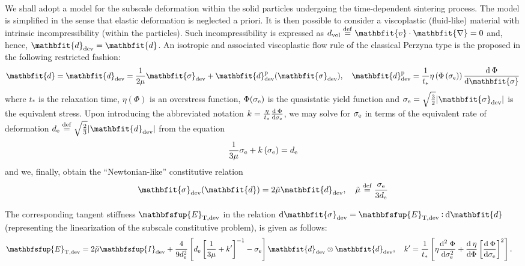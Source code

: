 \documentclass[10pt,a4paper]{article}
\renewcommand{\ta}[1]{\mathbfit{#1}}
\renewcommand{\ts}[1]{\mathbfit{#1}}
\renewcommand{\tf}[1]{\mathbfsfup{#1}}
\newcommand{\tang}{\mathrm{T}}
\begin{document}
We shall adopt a model for the subscale deformation within the solid particles undergoing the time-dependent sintering process. The model is simplified in the sense that elastic deformation is neglected a priori. It is then possible to consider a viscoplastic (fluid-like) material with intrinsic incompressibility (within the particles). Such incompressibility is expressed as $d_\vol\defeq\ta{v}\cdot\ts{\nabla}=0$ and, hence, $\ts{d}_\dev=\ts{d}$. An isotropic and associated viscoplastic flow rule of the classical Perzyna type is the proposed in the following restricted fashion:
\begin{equation}
    \ts{d}=\ts{d}_\dev = \frac{1}{2\mu}\ts{\sigma}_\dev + \ts{d}_\dev^\pl(\ts{\sigma}_\dev), \quad
    \ts{d}_\dev^\pl = \frac{1}{t_*}\eta\left(\Phi\left(\sigma_\eqv\right)\right)\od{\Phi}{\ts\sigma}
\label{eq201}
\end{equation}
where $t_*$ is the relaxation time, $\eta(\Phi)$ is an overstress function, $\Phi(\sigma_{\mathrm{e}})$ is the quasistatic yield function and $\sigma_\eqv=\sqrt{\frac{3}{2}}|\ts{\sigma}_\dev|$ is the equivalent stress. Upon introducing the abbreviated notation $k=\frac{\eta}{t_*}\frac{\operatorname{d \!}\:\Phi}{\operatorname{d \!} \sigma_{\mathrm{e}}}$, we may solve for $\sigma_{\mathrm{e}}$ in terms of the equivalent rate of deformation $d_\eqv\defeq\sqrt{\frac{2}{3}}|\ts{d}_\dev|$ from the equation
\begin{equation}
    \frac{1}{3\mu}\sigma_{\mathrm{e}} + k\left(\sigma_{\mathrm{e}}\right) = d_{\mathrm{e}}
\label{eq202}
\end{equation}
and we, finally, obtain the ``Newtonian-like'' constitutive relation
\begin{equation}
    \ts{\sigma}_\dev(\ts{d}) = 2\tilde{\mu}\ts{d}_\dev, \quad
    \tilde{\mu}\defeq \frac{\sigma_\eqv}{3d_\eqv}
\label{eq203}
\end{equation}

The corresponding tangent stiffness $\tf{E}_{\tang,\dev}$ in the relation $\dif\ts{\sigma}_\dev=\tf{E}_{\tang,\dev}\dprod\dif\ts{d}$ (representing the linearization of the subscale constitutive problem), is given as follows:
\begin{align}
 \tf E_{\tang,\dev} &= 2\tilde{\mu} \tf I_\dev + \frac{4}{9 d_\eqv^2} \left[ d_\eqv \left[ \frac{1}{3\mu} + k' \right]^{-1} - \sigma_\eqv \right] \ts d_\dev \outerp\ts d_\dev
 ,\quad k' = \frac{1}{t_*}\left[\eta \frac{\mathrm{d}^2\;\Phi}{\dif\sigma_\eqv^2} + \od{\eta}{\Phi}\left[\od{\Phi}{\sigma_\eqv}\right]^2\right].
\end{align}
\end{document}
